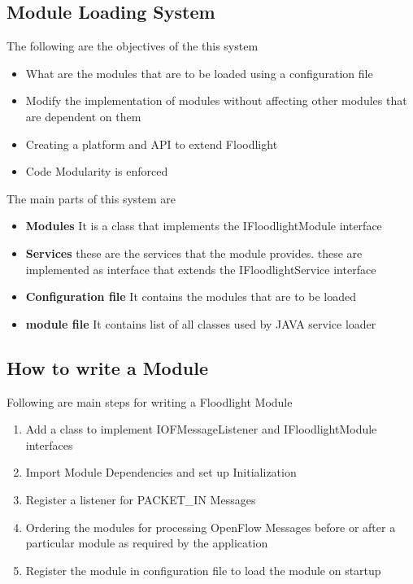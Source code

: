 \subsection{Module Loading System} The following are the objectives of the this system
\begin{itemize}
    \item What are the modules that are to be loaded using a configuration file
    \item Modify the implementation of modules without affecting other modules that are dependent on them
    \item Creating a platform and API to extend Floodlight
    \item Code Modularity is enforced
    \end{itemize}
The main parts of this system are 
\begin{itemize}
    \item \textbf{Modules} It is a class that implements the IFloodlightModule interface
    \item \textbf{Services} these are the services that the module provides. these are implemented as interface that extends the IFloodlightService interface
    \item \textbf{Configuration file} It contains the modules that are to be loaded
    \item \textbf{module file} It contains list of all classes used by JAVA service loader  
\end{itemize}

\subsection{How to write a Module} Following are main steps for writing a Floodlight Module
\begin{enumerate}
    \item Add a class to implement IOFMessageListener and IFloodlightModule interfaces
    \item Import Module Dependencies and set up Initialization
    \item Register a listener for PACKET\_IN Messages
    \item Ordering the modules for processing OpenFlow Messages before or after a particular module as required by the application
    \item Register the module in configuration file to load the module on startup
\end{enumerate}
    
